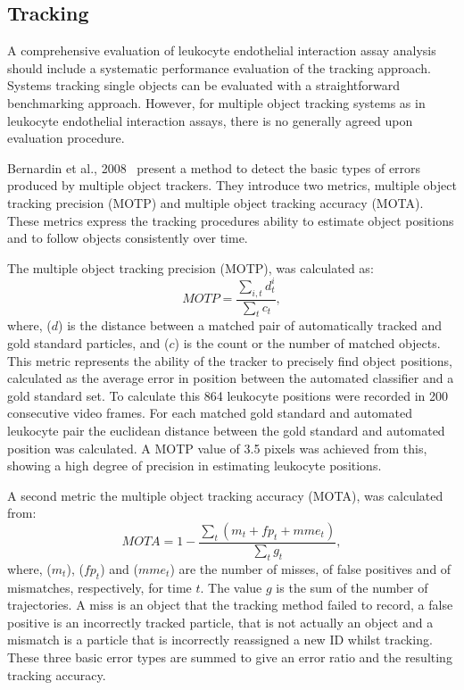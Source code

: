 \subsection{Tracking}
\label{leukocytes:validation:tracking}
A comprehensive evaluation of leukocyte endothelial interaction assay analysis should include a systematic performance evaluation of the tracking approach. Systems tracking single objects can be evaluated with a straightforward benchmarking approach. However, for multiple object tracking systems as in leukocyte endothelial interaction assays, there is no generally agreed upon evaluation procedure.

Bernardin et al., 2008~\cite{Bernardin2008} present a method to detect the basic types of errors produced by multiple object trackers. They introduce two metrics, multiple object tracking precision (MOTP) and multiple object tracking accuracy (MOTA). These metrics express the tracking procedures ability to estimate object positions and to follow objects consistently over time.

The multiple object tracking precision (MOTP), was calculated as:
\begin{equation}
	MOTP=\frac{\sum_{i,t}d_{t}^{i}}{\sum_{t}c_{t}},
\end{equation}
where, ($d$) is the distance between a matched pair of automatically tracked and gold standard particles, and ($c$) is the count or the number of matched objects. This metric represents the ability of the tracker to precisely find object positions, calculated as the average error in position between the automated classifier and a gold standard set. To calculate this 864 leukocyte positions were recorded in 200 consecutive video frames. For each matched gold standard and automated leukocyte pair the euclidean distance between the gold standard and automated position was calculated. A MOTP value of 3.5 pixels was achieved from this, showing a high degree of precision in estimating leukocyte positions.

A second metric the multiple object tracking accuracy (MOTA), was calculated from:
\begin{equation}
	MOTA=1-\frac{\sum_{t}(m_t+fp_t+mme_t)}{\sum_{t}g_{t}},
\end{equation}
where, ($m_t$), ($fp_t$) and ($mme_t$) are the number of misses, of false positives and of mismatches, respectively, for time $t$. The value $g$ is the sum of the number of trajectories. A miss is an object that the tracking method failed to record, a false positive is an incorrectly tracked particle, that is not actually an object and a mismatch is a particle that is incorrectly reassigned a new ID whilst tracking. These three basic error types are summed to give an error ratio and the resulting tracking accuracy.

